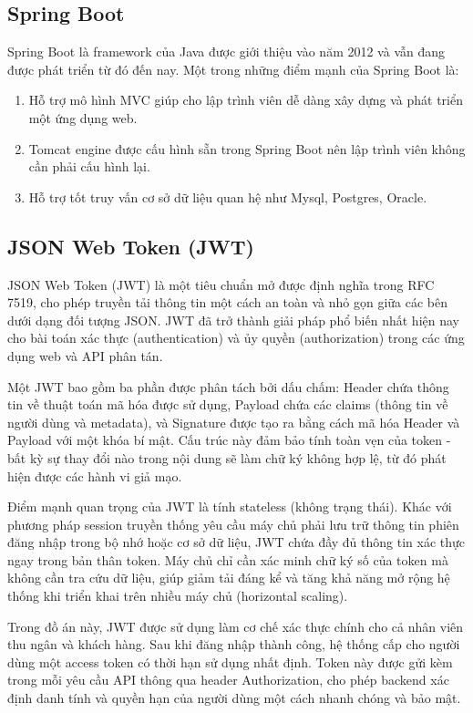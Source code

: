 \documentclass[../20232006p.tex]{subfiles}
\begin{document}
\subsection{Spring Boot}

Spring Boot \cite{springboot} là framework của Java được giới thiệu vào năm 2012 và vẫn đang được phát triển từ đó đến nay. Một trong những điểm mạnh của Spring Boot là:

\begin{enumerate}[label=(\roman*)]
    \item  Hỗ trợ mô hình MVC giúp cho lập trình viên dễ dàng xây dựng và phát triển một ứng dụng web.
    \item Tomcat engine được cấu hình sẵn trong Spring Boot nên lập trình viên không cần phải cấu hình lại.
    \item Hỗ trợ tốt truy vấn cơ sở dữ liệu quan hệ như Mysql, Postgres, Oracle.
\end{enumerate}

\subsection{JSON Web Token (JWT)}

JSON Web Token (JWT) \cite{jwt} là một tiêu chuẩn mở được định nghĩa trong RFC 7519, cho phép truyền tải thông tin một cách an toàn và nhỏ gọn giữa các bên dưới dạng đối tượng JSON. JWT đã trở thành giải pháp phổ biến nhất hiện nay cho bài toán xác thực (authentication) và ủy quyền (authorization) trong các ứng dụng web và API phân tán.

Một JWT bao gồm ba phần được phân tách bởi dấu chấm: Header chứa thông tin về thuật toán mã hóa được sử dụng, Payload chứa các claims (thông tin về người dùng và metadata), và Signature được tạo ra bằng cách mã hóa Header và Payload với một khóa bí mật. Cấu trúc này đảm bảo tính toàn vẹn của token - bất kỳ sự thay đổi nào trong nội dung sẽ làm chữ ký không hợp lệ, từ đó phát hiện được các hành vi giả mạo.

Điểm mạnh quan trọng của JWT là tính stateless (không trạng thái). Khác với phương pháp session truyền thống yêu cầu máy chủ phải lưu trữ thông tin phiên đăng nhập trong bộ nhớ hoặc cơ sở dữ liệu, JWT chứa đầy đủ thông tin xác thực ngay trong bản thân token. Máy chủ chỉ cần xác minh chữ ký số của token mà không cần tra cứu dữ liệu, giúp giảm tải đáng kể và tăng khả năng mở rộng hệ thống khi triển khai trên nhiều máy chủ (horizontal scaling).

Trong đồ án này, JWT được sử dụng làm cơ chế xác thực chính cho cả nhân viên thu ngân và khách hàng. Sau khi đăng nhập thành công, hệ thống cấp cho người dùng một access token có thời hạn sử dụng nhất định. Token này được gửi kèm trong mỗi yêu cầu API thông qua header Authorization, cho phép backend xác định danh tính và quyền hạn của người dùng một cách nhanh chóng và bảo mật.
\end{document}
